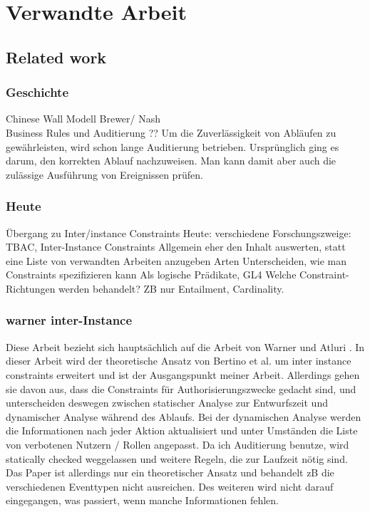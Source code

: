 
\chapter{Verwandte Arbeit} %

\label{Chapter3} %



\section{Related work}


\subsection{Geschichte}
Chinese Wall Modell Brewer/ Nash\\
Business Rules und Auditierung ??
Um die Zuverlässigkeit von Abläufen zu gewährleisten, wird schon lange Auditierung betrieben. Ursprünglich ging es darum, den korrekten Ablauf nachzuweisen. Man kann damit aber auch die zulässige Ausführung von Ereignissen prüfen.
\subsection{Heute}
Übergang zu Inter/instance Constraints
Heute: verschiedene Forschungszweige: TBAC, Inter-Instance Constraints
Allgemein eher den Inhalt auswerten, statt eine Liste von verwandten Arbeiten anzugeben
Arten Unterscheiden, wie man Constraints spezifizieren kann
Als logische Prädikate, GL4
Welche Constraint-Richtungen werden behandelt?
ZB nur Entailment, Cardinality. 
\subsection{warner inter-Instance}
Diese Arbeit bezieht sich hauptsächlich auf die Arbeit von Warner und Atluri \cite{warner_inter_instance}.
In dieser Arbeit wird der theoretische Ansatz von Bertino et al. um inter instance constraints erweitert und ist der Ausgangspunkt meiner Arbeit. Allerdings gehen sie davon aus, dass die Constraints für Authorisierungszwecke gedacht sind, und unterscheiden deswegen zwischen statischer Analyse zur Entwurfszeit und dynamischer Analyse während des Ablaufs. Bei der dynamischen Analyse werden die Informationen nach jeder Aktion  aktualisiert und unter Umständen die Liste von verbotenen Nutzern / Rollen angepasst.
Da ich Auditierung benutze, wird statically checked weggelassen und weitere Regeln, die zur Laufzeit nötig sind.\\
Das Paper ist allerdings nur ein theoretischer Ansatz und behandelt zB die verschiedenen Eventtypen nicht ausreichen. Des weiteren wird nicht darauf eingegangen, was passiert, wenn  manche Informationen fehlen.
